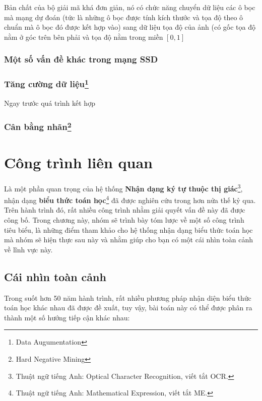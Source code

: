 \documentclass[a4paper,12pt]{article}
\begin{document}
	Bản chất của bộ giải mã khá đơn giản, nó có chức năng chuyển dữ liệu các ô bọc mà mạng dự đoán (tức là những ô bọc được tính kích thước và tọa độ theo ô chuẩn mà ô bọc đó được kết hợp vào) sang dữ liệu tọa độ của ảnh (có gốc tọa độ nằm ở góc trên bên phải và tọa độ nằm trong miền $[0, 1]$
	
	\subsubsection{Một số vấn đề khác trong mạng SSD}
	\subsubsection*{Tăng cường dữ liệu\footnote{Data Augumentation}}
	
	Ngay trước quá trình kết hợp
	
	\subsubsection*{Cân bằng nhãn\footnote{Hard Negative Mining}}	
	
	
	\newpage
	\section{Công trình liên quan}
	Là một phần quan trọng của hệ thống \textbf{Nhận dạng ký tự thuộc thị giác}\footnote{Thuật ngữ tiếng Anh: Optical Character Recognition, viết tắt OCR.}, nhận dạng \textbf{biểu thức toán học}\footnote{Thuật ngữ tiếng Anh: Mathematical Expression, viết tắt ME.} đã được nghiên cứu trong hơn nửa thế kỷ qua. Trên hành trình đó, rất nhiều công trình nhằm giải quyết vấn đề này đã được công bố. Trong chương này, nhóm sẽ trình bày tóm lược về một số công trình tiêu biểu, là những điểm tham khảo cho hệ thống nhận dạng biểu thức toán học mà nhóm sẽ hiện thực sau này và nhằm giúp cho bạn có một cái nhìn toàn cảnh về lĩnh vực này.
	\subsection{Cái nhìn toàn cảnh}
	
	Trong suốt hơn 50 năm hành trình, rất nhiều phương pháp nhận diện biểu thức toán học khác nhau đã được đề xuất, tuy vậy, bài toán này có thể được phân ra thành một số hướng tiếp cận khác nhau:
	
\end{document}
